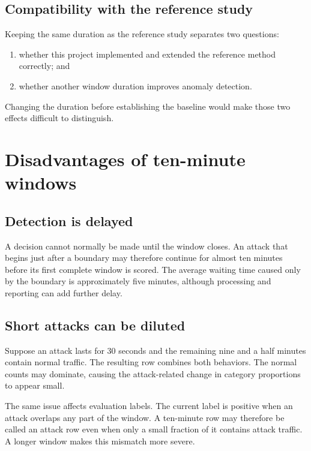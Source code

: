 \documentclass[11pt,a4paper]{article}
\begin{document}
\subsection{Compatibility with the reference study}

Keeping the same duration as the reference study separates two questions:

\begin{enumerate}
  \item whether this project implemented and extended the reference method
        correctly; and
  \item whether another window duration improves anomaly detection.
\end{enumerate}

Changing the duration before establishing the baseline would make those two
effects difficult to distinguish.

\section{Disadvantages of ten-minute windows}

\subsection{Detection is delayed}

A decision cannot normally be made until the window closes.  An attack that
begins just after a boundary may therefore continue for almost ten minutes
before its first complete window is scored.  The average waiting time caused
only by the boundary is approximately five minutes, although processing and
reporting can add further delay.

\subsection{Short attacks can be diluted}

Suppose an attack lasts for 30 seconds and the remaining nine and a half
minutes contain normal traffic.  The resulting row combines both behaviors.
The normal counts may dominate, causing the attack-related change in category
proportions to appear small.

The same issue affects evaluation labels.  The current label is positive when
an attack overlaps any part of the window.  A ten-minute row may therefore be
called an attack row even when only a small fraction of it contains attack
traffic.  A longer window makes this mismatch more severe.
\end{document}
